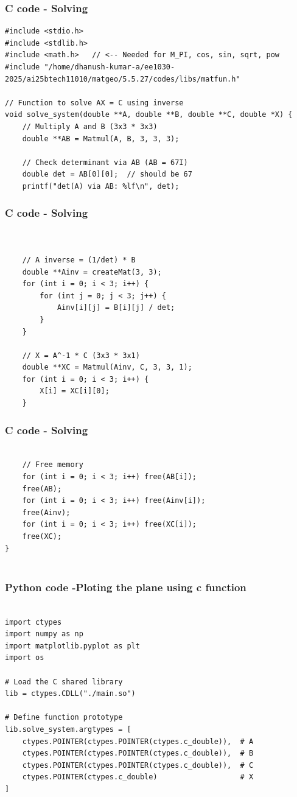\documentclass{beamer}
\begin{document}
\begin{frame}[fragile]                            
\frametitle{C code - Solving}                
\begin{lstlisting}
#include <stdio.h>
#include <stdlib.h>
#include <math.h>   // <-- Needed for M_PI, cos, sin, sqrt, pow
#include "/home/dhanush-kumar-a/ee1030-2025/ai25btech11010/matgeo/5.5.27/codes/libs/matfun.h"

// Function to solve AX = C using inverse
void solve_system(double **A, double **B, double **C, double *X) {
    // Multiply A and B (3x3 * 3x3)
    double **AB = Matmul(A, B, 3, 3, 3);

    // Check determinant via AB (AB = 67I)
    double det = AB[0][0];  // should be 67
    printf("det(A) via AB: %lf\n", det);
\end{lstlisting}
\end{frame}
\begin{frame}[fragile]                            
\frametitle{C code - Solving}                
\begin{lstlisting}


    // A inverse = (1/det) * B
    double **Ainv = createMat(3, 3);
    for (int i = 0; i < 3; i++) {
        for (int j = 0; j < 3; j++) {
            Ainv[i][j] = B[i][j] / det;
        }
    }

    // X = A^-1 * C (3x3 * 3x1)
    double **XC = Matmul(Ainv, C, 3, 3, 1);
    for (int i = 0; i < 3; i++) {
        X[i] = XC[i][0];
    }
\end{lstlisting}
\end{frame}
\begin{frame}[fragile]                            
\frametitle{C code - Solving}                
\begin{lstlisting}

    // Free memory
    for (int i = 0; i < 3; i++) free(AB[i]);
    free(AB);
    for (int i = 0; i < 3; i++) free(Ainv[i]);
    free(Ainv);
    for (int i = 0; i < 3; i++) free(XC[i]);
    free(XC);
}


\end{lstlisting}
\end{frame}

	
\begin{frame}[fragile]                              
	\frametitle{Python code -Ploting the plane using c function} 
	\begin{lstlisting}

import ctypes
import numpy as np
import matplotlib.pyplot as plt
import os

# Load the C shared library
lib = ctypes.CDLL("./main.so")

# Define function prototype
lib.solve_system.argtypes = [
    ctypes.POINTER(ctypes.POINTER(ctypes.c_double)),  # A
    ctypes.POINTER(ctypes.POINTER(ctypes.c_double)),  # B
    ctypes.POINTER(ctypes.POINTER(ctypes.c_double)),  # C
    ctypes.POINTER(ctypes.c_double)                   # X
]
\end{lstlisting}
\end{frame}
\end{document}
